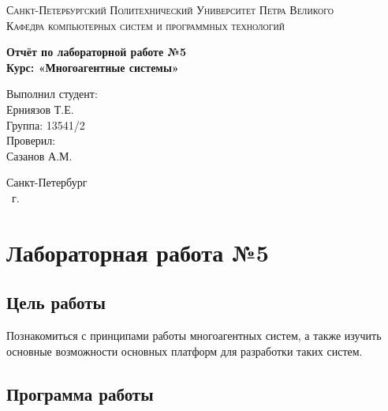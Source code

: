 \documentclass[14pt,a4paper,report]{report}
\begin{document}
\def\contentsname{Содержание}

\begin{titlepage}
	\begin{center}
		\textsc{Санкт-Петербургский Политехнический 
			Университет Петра Великого\\[5mm]
			Кафедра компьютерных систем и программных технологий}
		
		\vfill
		
		\textbf{Отчёт по лабораторной работе №5\\[3mm]
			Курс: «Многоагентные системы»\\[41mm]
		}
	\end{center}
	
	\hfill
	\begin{minipage}{.4\textwidth}
		Выполнил студент:\\[2mm] 
		Ерниязов Т.Е.\\
		Группа: 13541/2\\[5mm]
		
		Проверил:\\[2mm] 
		Сазанов А.М.
	\end{minipage}
	\vfill
	\begin{center}
		Санкт-Петербург\\ \the\year\ г.
	\end{center}
\end{titlepage}

\tableofcontents
\clearpage

\chapter{Лабораторная работа №5}

\section{Цель работы}

Познакомиться с принципами работы многоагентных систем, а также изучить основные возможности основных платформ для разработки таких систем.

\section{Программа работы}
\end{document}
